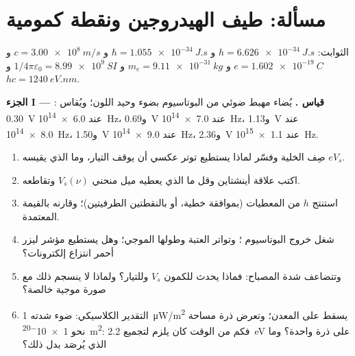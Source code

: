 \section{مسألة: طيف الهيدروجين ونقطة كمومية}

\begin{problem}
\label{pb:b1:quantum-introduction:1}
الثوابت: $h = \qty{6.626e-34}{J.s}$ و $\hbar = \qty{1.055e-34}{J.s}$ و $c =
\qty{3.00e8}{m/s}$ و $e = \qty{1.602e-19}{C}$ و $m_e = \qty{9.11e-31}{kg}$
و $1/4\pi\varepsilon_0 = \qty{8.99e9}{SI}$ و $hc = \qty{1240}{eV.nm}$.

\medskip
\noindent\textbf{الجزء I --- قياس .}
يُضاء مهبط ضوئي من البوتاسيوم بضوء وحيد اللون؛ ويُقاس : \qty{0.30}{V} عند \qty{6.0e14}{Hz}، و\qty{0.69}{V} عند
\qty{7.0e14}{Hz}، و\qty{1.13}{V} عند \qty{8.0e14}{Hz}، و\qty{1.50}{V} عند
\qty{9.0e14}{Hz}، و\qty{2.36}{V} عند \qty{1.1e15}{Hz}.
\begin{enumerate}
  \item صِف الخلية وفسّر لماذا يستطيع توتر عكسي أن يوقف
        التيار، وما الذي يقيسه $eV_s$.
  \item اكتب علاقة أينشتاين وقل ما الذي يعطيه ميل
        منحني $V_s(\nu)$ وتقاطعه.
  \item استنتج $h$ من المعطيات (بموافقة خطية، أو بالنقطتين
        الطرفيتين)؛ وقارنه بالقيمة المعتمدة.
  \item شغل خروج البوتاسيوم ؛ وتواتر العتبة وطولها
        الموجي؛ وهل يستطيع مؤشر ليزر أحمر انتزاع إلكترونات؟
  \item وتتضاعف شدة المصباح: فماذا يحدث للكمون $V_s$ وللتيار؟
        ولماذا لا ينسجم ذلك مع صورة موجية خالصة؟
  \item التقدير الكلاسيكي: ضوء شدته \qty{1}{\micro W/m^2} يسقط على
        المعدن؛ وتعرض ذرة مساحة نحو \qty{1e-20}{m^2}: فكم من الوقت
        كان يلزم لتجميع \qty{2.2}{eV} على ذرة واحدة؟ وما الذي
        يُرصَد بدل ذلك؟
\end{enumerate}


\end{problem}
